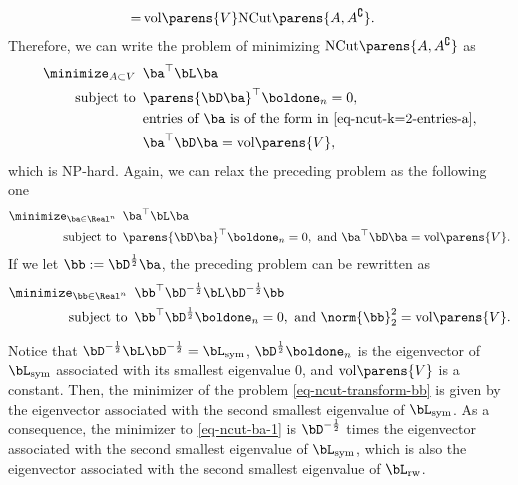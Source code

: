 \documentclass[12pt]{article}
\begin{document}
\begin{enumerate}[label=\textbf{\arabic*.}]
\begin{enumerate}
\begin{align*}
			= & \, \mathrm{vol} \parens{V} \mathrm{NCut} \parens{A, A^{\complement}}. 
		\end{align*}
		Therefore, we can write the problem of minimizing $\mathrm{NCut} \parens{A, A^{\complement}}$ as 
		\begin{equation}\label{eq-ncut-ba}
			\begin{aligned}
			\minimize_{A \subset V} \ & \, \ba^\top \bL \ba \\ 
			\text{ subject to } & \, \parens{\bD \ba}^\top \boldone_n = 0, \\ 
			& \, \text{entries of $\ba$ is of the form in \eqref{eq-ncut-k=2-entries-a}}, \\ 
			& \, \ba^\top \bD \ba = \mathrm{vol} \parens{V}, 
			\end{aligned}
		\end{equation}
		which is NP-hard. Again, we can relax the preceding problem as the following one 
		\begin{equation}\label{eq-ncut-ba-1}
			\begin{aligned}
				\minimize_{\ba \in \Real^n} \ & \, \ba^\top \bL \ba \\ 
				\text{ subject to } & \, \parens{\bD \ba}^\top \boldone_n = 0, \text{ and } \ba^\top \bD \ba = \mathrm{vol} \parens{V}. 
			\end{aligned}
		\end{equation}
		If we let $\bb := \bD^{\frac{1}{2}} \ba$, the preceding problem can be rewritten as 
		\begin{equation}\label{eq-ncut-transform-bb}
			\begin{aligned}
				\minimize_{\bb \in \Real^n} \ & \, \bb^\top \bD^{-\frac{1}{2}} \bL \bD^{-\frac{1}{2}} \bb \\ 
				\text{ subject to } & \, \bb^\top \bD^{\frac{1}{2}} \boldone_n = 0, \text{ and } \norm{\bb}_2^2 = \mathrm{vol} \parens{V}. 
			\end{aligned}
		\end{equation}
		
		Notice that $\bD^{- \frac{1}{2}} \bL \bD^{- \frac{1}{2}} = \bL_{\mathrm{sym}}$, $\bD^{\frac{1}{2}} \boldone_n$ is the eigenvector of $\bL_{\mathrm{sym}}$ associated with its smallest eigenvalue 0, and $\mathrm{vol} \parens{V}$ is a constant. Then, the minimizer of the problem \eqref{eq-ncut-transform-bb} is given by the eigenvector associated with the second smallest eigenvalue of $\bL_{\mathrm{sym}}$. As a consequence, the minimizer to \eqref{eq-ncut-ba-1} is $\bD^{-\frac{1}{2}}$ times the eigenvector associated with the second smallest eigenvalue of $\bL_{\mathrm{sym}}$, which is also the eigenvector associated with the second smallest eigenvalue of $\bL_{\mathrm{rw}}$. 
		

\end{enumerate}
\end{enumerate}
\end{document}
